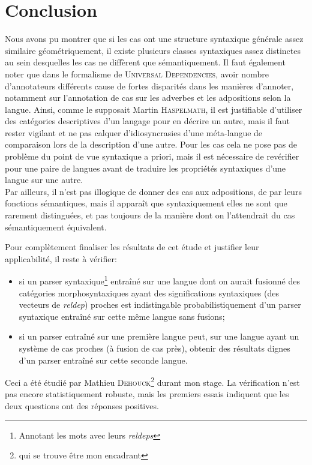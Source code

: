 \documentclass{cours}
\begin{document}
\section{Conclusion}
Nous avons pu montrer que si les cas ont une structure syntaxique générale assez similaire géométriquement, il existe plusieurs classes syntaxiques assez distinctes au sein desquelles les cas ne diffèrent que sémantiquement.
Il faut également noter que dans le formalisme de \textsc{Universal Dependencies}, avoir nombre d'annotateurs différents cause de fortes disparités dans les manières d'annoter, notamment sur l'annotation de cas sur les adverbes et les adpositions selon la langue.
Ainsi, comme le supposait Martin \textsc{Haspelmath}, il est justifiable d'utiliser des catégories descriptives d'un langage pour en décrire un autre, mais il faut rester vigilant et ne pas calquer d'idiosyncrasies d'une méta-langue de comparaison lors de la description d'une autre.
Pour les cas cela ne pose pas de problème du point de vue syntaxique a priori, mais il est nécessaire de revérifier pour une paire de langues avant de traduire les propriétés syntaxiques d'une langue sur une autre.
\\
Par ailleurs, il n'est pas illogique de donner des cas aux adpositions, de par leurs fonctions sémantiques, mais il apparaît que syntaxiquement elles ne sont que rarement distinguées, et pas toujours de la manière dont on l'attendrait du cas sémantiquement équivalent.

\medskip

Pour complètement finaliser les résultats de cet étude et justifier leur applicabilité, il reste à vérifier:
\begin{itemize}
	\item si un parser syntaxique\footnote{Annotant les mots avec leurs \textit{reldeps}} entraîné sur une langue dont on aurait fusionné des catégories morphosyntaxiques ayant des significations syntaxiques (des vecteurs de \textit{reldep}) proches est indistingable probabilistiquement d'un parser syntaxique entraîné sur cette même langue sans fusions;
	\item si un parser entraîné sur une première langue peut, sur une langue ayant un système de cas proches (à fusion de cas près), obtenir des résultats dignes d'un parser entraîné sur cette seconde langue.
\end{itemize}

Ceci a été étudié par Mathieu \textsc{Dehouck}\footnote{qui se trouve être mon encadrant} durant mon stage.
La vérification n'est pas encore statistiquement robuste, mais les premiers essais indiquent que les deux questions ont des réponses positives.



\appendix



\end{document}
